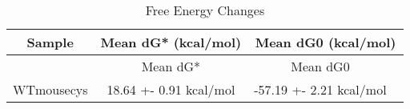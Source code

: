 \documentclass{article}
\begin{document}
\begin{table}[ht]
    \centering
    \begin{tabular}{|c|c|c|}
    \hline
    Sample & Mean dG* (kcal/mol) & Mean dG0 (kcal/mol) \\
    \hline
      & Mean dG* & Mean dG0 \ \\
    WTmousecys & 18.64 +- 0.91 kcal/mol & -57.19 +- 2.21 kcal/mol \ \\
    \hline
    \end{tabular}
    \caption{Free Energy Changes}
\end{table}
\end{document}
